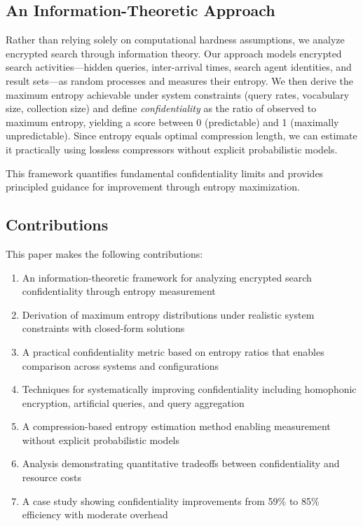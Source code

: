 \documentclass[final,11pt]{article}
\numberwithin{equation}{section}
\theoremstyle{plain}
\theoremstyle{remark}
\begin{document}
\subsection{An Information-Theoretic Approach}
Rather than relying solely on computational hardness assumptions, we analyze encrypted search through information theory. Our approach models encrypted search activities---hidden queries, inter-arrival times, search agent identities, and result sets---as random processes and measures their entropy. We then derive the maximum entropy achievable under system constraints (query rates, vocabulary size, collection size) and define \emph{confidentiality} as the ratio of observed to maximum entropy, yielding a score between 0 (predictable) and 1 (maximally unpredictable). Since entropy equals optimal compression length, we can estimate it practically using lossless compressors without explicit probabilistic models.

This framework quantifies fundamental confidentiality limits and provides principled guidance for improvement through entropy maximization.

\subsection{Contributions}
This paper makes the following contributions:
\begin{enumerate}
    \item An information-theoretic framework for analyzing encrypted search confidentiality through entropy measurement
    \item Derivation of maximum entropy distributions under realistic system constraints with closed-form solutions
    \item A practical confidentiality metric based on entropy ratios that enables comparison across systems and configurations
    \item Techniques for systematically improving confidentiality including homophonic encryption, artificial queries, and query aggregation
    \item A compression-based entropy estimation method enabling measurement without explicit probabilistic models
    \item Analysis demonstrating quantitative tradeoffs between confidentiality and resource costs
    \item A case study showing confidentiality improvements from 59\% to 85\% efficiency with moderate overhead
\end{enumerate}
\end{document}
